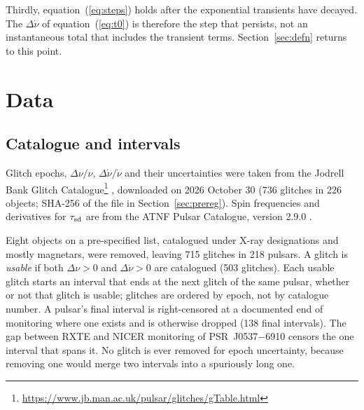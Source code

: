 \documentclass[fleqn,usenatbib]{mnras}
\newcommand{\dnu}{\Delta\nu/\nu}
\newcommand{\dnud}{\Delta\dot\nu/\dot\nu}
\newcommand{\psr}[1]{PSR~#1}
\begin{document}
Thirdly, equation~(\ref{eq:steps}) holds after the exponential transients
have decayed. The $\Delta\dot\nu$ of equation~(\ref{eq:t0}) is therefore the
step that persists, not an instantaneous total that includes the transient
terms. Section~\ref{sec:defn} returns to this point.

\section{Data}\label{sec:data}
\subsection{Catalogue and intervals}
Glitch epochs, $\dnu$, $\dnud$ and their uncertainties were taken from the
Jodrell Bank Glitch
Catalogue\footnote{\url{https://www.jb.man.ac.uk/pulsar/glitches/gTable.html}}
\citep{espinoza2011,basu2022}, downloaded on 2026 October 30 (736 glitches
in 226 objects; SHA-256 of the file in Section~\ref{sec:prereg}). Spin
frequencies and derivatives for $\tau_{\rm sd}$ are from the ATNF Pulsar
Catalogue, version 2.9.0 \citep{manchester2005}.

Eight objects on a pre-specified list, catalogued under X-ray
designations and mostly magnetars, were removed, leaving 715 glitches in
218 pulsars. A glitch is \emph{usable} if
both $\Delta\nu>0$ and $\Delta\dot\nu>0$ are catalogued (503 glitches). Each
usable glitch starts an interval that ends at the next glitch of the same
pulsar, whether or not that glitch is usable; glitches are ordered by epoch,
not by catalogue number. A pulsar's final interval is right-censored at a
documented end of monitoring where one exists
\citep[e.g.][]{basu2022,gugercinoglu2022,ho2026} and is otherwise dropped
(138 final intervals). The gap between RXTE and NICER monitoring of
\psr{J0537$-$6910} \citep{antonopoulou2018,ho2026} censors the one interval
that spans it. No glitch is ever removed for epoch uncertainty, because
removing one would merge two intervals into a spuriously long one.
\end{document}
